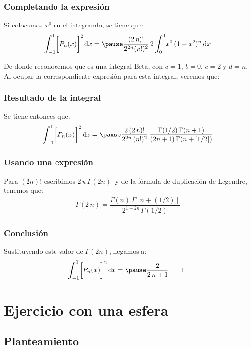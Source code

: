\documentclass[12pt]{beamer}
\begin{document}
\begin{frame}
\frametitle{Completando la expresión}
Si colocamos $x^{0}$ en el integrando, se tiene que: \pause
\begin{eqnarray*}
\scaleint{6ex}_{\bs -1}^{1} \bigg[ P_{n}(x) \bigg]^{2} \dd{x} = \pause \dfrac{(2 \, n)!}{2^{2n} (n!)^{2}} \, 2 \, \scaleint{6ex}_{\bs 0}^{1} x^{0} \, (1 - x^{2})^{n} \dd{x}
\end{eqnarray*}

\pause
De donde reconocemos que es una integral Beta, con $a = 1$, $b = 0$, $c = 2$ y $d = n$. Al ocupar la correspondiente expresión para esta integral, veremos que:
\end{frame}
\begin{frame}
\frametitle{Resultado de la integral}
Se tiene entonces que:
\pause
\begin{align*}
\scaleint{6ex}_{\bs -1}^{1} \bigg[ P_{n}(x) \bigg]^{2} \dd{x} = \pause \dfrac{2 \, (2 \, n)!}{2^{2n} \, (n!)^{2}} \, \dfrac{\Gamma(1/2) \, \Gamma(n + 1)}{(2 n + 1) \, \Gamma (n + [1/2])}
\end{align*}
\end{frame}
\begin{frame}
\frametitle{Usando una expresión}
Para $(2 n)!$ escribimos $2 \, n \, \Gamma (2n)$, y de la fórmula de duplicación de Legendre, tenemos que:
\begin{align*}
\Gamma( 2 \, n) = \dfrac{\Gamma (n) \, \Gamma [n + (1/2)]}{2^{1-2n} \, \Gamma(1/2)}
\end{align*}
\end{frame}
\begin{frame}
\frametitle{Conclusión}
Sustituyendo este valor de $\Gamma(2n)$, llegamos a:
\pause
\begin{eqnarray*}
\scaleint{6ex}_{\bs -1}^{1} \bigg[ P_{n}(x) \bigg]^{2} \dd{x} = \pause \dfrac{2}{2 \, n + 1} \qed
\end{eqnarray*}
\end{frame}

\section{Ejercicio con una esfera}
\subsection{Planteamiento}
\end{document}
